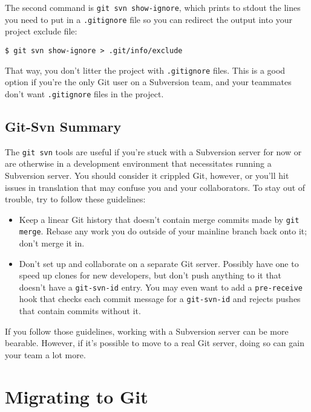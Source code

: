 \documentclass[a4paper]{book}
\begin{document}
The second command is \texttt{git svn show-ignore}, which prints to stdout the lines you need to put in a \texttt{.gitignore} file so you can redirect the output into your project exclude file:

\begin{shaded}\begin{verbatim}
$ git svn show-ignore > .git/info/exclude
\end{verbatim}\end{shaded}

That way, you don't litter the project with \texttt{.gitignore} files. This is a good option if you're the only Git user on a Subversion team, and your teammates don't want \texttt{.gitignore} files in the project.

\subsection{Git-Svn Summary}

The \texttt{git svn} tools are useful if you're stuck with a Subversion server for now or are otherwise in a development environment that necessitates running a Subversion server. You should consider it crippled Git, however, or you'll hit issues in translation that may confuse you and your collaborators. To stay out of trouble, try to follow these guidelines:

\begin{itemize}
\itemsep1pt\parskip0pt
\item
  Keep a linear Git history that doesn't contain merge commits made by \texttt{git merge}. Rebase any work you do outside of your mainline branch back onto it; don't merge it in.
\item
  Don't set up and collaborate on a separate Git server. Possibly have one to speed up clones for new developers, but don't push anything to it that doesn't have a \texttt{git-svn-id} entry. You may even want to add a \texttt{pre-receive} hook that checks each commit message for a \texttt{git-svn-id} and rejects pushes that contain commits without it.
\end{itemize}

If you follow those guidelines, working with a Subversion server can be more bearable. However, if it's possible to move to a real Git server, doing so can gain your team a lot more.

\section{Migrating to Git}
\end{document}
